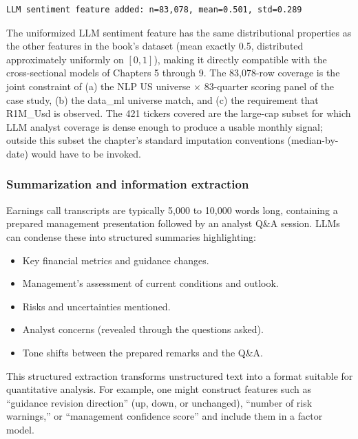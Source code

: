 \begin{verbatim}
LLM sentiment feature added: n=83,078, mean=0.501, std=0.289
\end{verbatim}

The uniformized LLM sentiment feature has the same distributional properties as the other features in the book's dataset (mean exactly 0.5, distributed approximately uniformly on $[0, 1]$), making it directly compatible with the cross-sectional models of Chapters 5 through 9. The 83,078-row coverage is the joint constraint of (a) the NLP US universe $\times$ 83-quarter scoring panel of the case study, (b) the data\_ml universe match, and (c) the requirement that R1M\_Usd is observed. The 421 tickers covered are the large-cap subset for which LLM analyst coverage is dense enough to produce a usable monthly signal; outside this subset the chapter's standard imputation conventions (median-by-date) would have to be invoked.

\subsubsection{Summarization and information extraction}

Earnings call transcripts are typically 5,000 to 10,000 words long, containing a prepared management presentation followed by an analyst Q\&A session. LLMs can condense these into structured summaries highlighting:

\begin{itemize}
\item Key financial metrics and guidance changes.
\item Management's assessment of current conditions and outlook.
\item Risks and uncertainties mentioned.
\item Analyst concerns (revealed through the questions asked).
\item Tone shifts between the prepared remarks and the Q\&A.
\end{itemize}

This structured extraction transforms unstructured text into a format suitable for quantitative analysis. For example, one might construct features such as ``guidance revision direction'' (up, down, or unchanged), ``number of risk warnings,'' or ``management confidence score'' and include them in a factor model.

